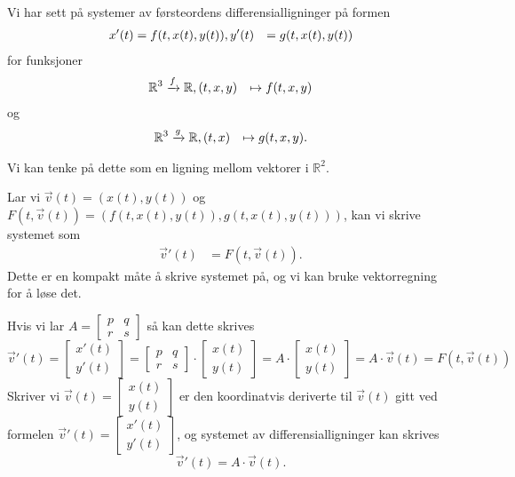 \documentclass{article}
\begin{document}
Vi har sett på systemer av førsteordens differensialligninger på formen
$$
\begin{align}
  x'(t) &= f(t,x(t), y(t)), \newline
  y'(t) &= g(t,x(t), y(t))
\end{align}
$$
for funksjoner
$$
\begin{align}
\mathbb{R}^3 &\xrightarrow f \mathbb{R}, \newline
(t, x, y) &\mapsto f(t, x, y)
\end{align}
$$
og
$$
\begin{align}
\mathbb{R}^3 &\xrightarrow g \mathbb{R}, \newline
(t, x) &\mapsto g(t, x, y).
\end{align}
$$

Vi kan tenke på dette som en ligning mellom vektorer i $\mathbb{R}^2$. 

Lar vi $\vec v(t) = (x(t), y(t))$ og $F(t, \vec v(t)) = (f(t, x(t), y(t)), g(t, x(t), y(t)))$, kan vi skrive systemet som
$$
\begin{align}
  \vec v'(t) &= F(t, \vec v(t)).
\end{align}
$$
Dette er en kompakt måte å skrive systemet på, og vi kan bruke vektorregning for å løse det.

Hvis vi lar 
$A = \begin{bmatrix}p&q\\r&s\end{bmatrix}$ så kan dette skrives 
$$\vec v'(t) = 
\begin{bmatrix}x'(t)\\y'(t)\end{bmatrix}
= \begin{bmatrix}p&q\\r&s\end{bmatrix} \cdot \begin{bmatrix}x(t)\\y(t)\end{bmatrix}
= A \cdot \begin{bmatrix}x(t)\\y(t)\end{bmatrix}
= A \cdot \vec v(t) = F(t, \vec v(t))$$
Skriver vi 
$\vec v(t) = \begin{bmatrix}x(t)\\y(t)\end{bmatrix}$
er den koordinatvis deriverte til $\vec v(t)$ gitt ved formelen
$\vec v'(t) = \begin{bmatrix}x'(t)\\y'(t)\end{bmatrix}$, og systemet av differensialligninger kan skrives
$$\vec v'(t) = A \cdot \vec v(t).$$
\end{document}
